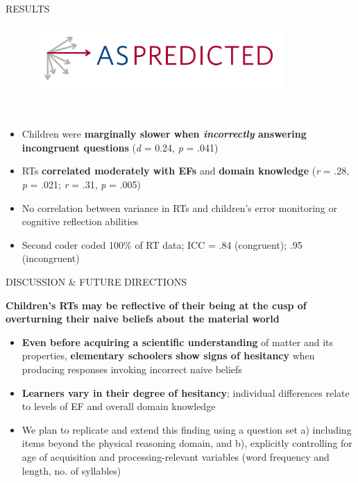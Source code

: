 \documentclass[final]{beamer}
\newlength{\colwidth}
\newlength{\widecolwidth}
\begin{document}
\begin{frame}[t]
\begin{columns}[t]
\begin{column}{\widecolwidth}
\begin{block}{RESULTS}
\begin{minipage}{0.45\textwidth}
\begin{figure}
      \href{https://aspredicted.org/DJG_YWR}{\includegraphics[height=2.5cm]{images/aspredicted.png}}\\[2ex]
\end{figure}
\\[2ex]
    \begin{itemize}
        \item Children were \textbf{marginally slower when \emph{incorrectly} answering incongruent questions} (\emph{d}  = 0.24, \emph{p} = .041)
        \item RTs \textbf{correlated moderately with EFs} and \textbf{domain knowledge} (\emph{r} = .28, \emph{p} = .021; \emph{r} = .31, \emph{p} = .005)
        \item No correlation between variance in RTs and children's error monitoring or cognitive reflection abilities
        \item Second coder coded 100\% of RT data; ICC = .84 (congruent); .95 (incongruent)
    \end{itemize}
\end{minipage}
\end{block}
    
\begin{block}{DISCUSSION \& FUTURE DIRECTIONS}
	\begin{tcolorbox}[
		colback=mycolor,
		colframe=mycolor,
		coltext=white,
		boxsep=2pt,
		left=2mm,
		right=2mm,
		top=2mm,
		bottom=2mm,
		arc=5mm,
		auto outer arc,
		boxrule=4pt,
		width=\dimexpr\linewidth-2\fboxsep\relax,
		]
		\centering
		\textbf{Children's RTs may be reflective of their being at the cusp of overturning their naive beliefs about the material world}
	\end{tcolorbox}
	
    \begin{itemize}
      \item \textbf{Even before acquiring a scientific understanding} of matter and its properties, \textbf{elementary schoolers show signs of hesitancy} when producing responses invoking incorrect naive beliefs
      \item \textbf{Learners vary in their degree of hesitancy}; individual differences relate to levels of EF and overall domain knowledge
      \item We plan to replicate and extend this finding using a question set a) including items beyond the physical reasoning domain, and b), explicitly controlling for age of acquisition and processing-relevant variables (word frequency and length, no. of syllables)
    \end{itemize}
\end{block}


\end{column}
\end{columns}
\end{frame}
\end{document}
